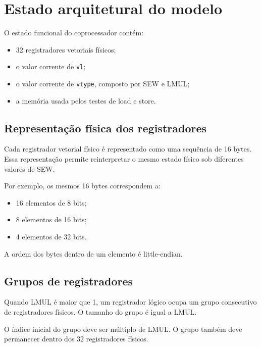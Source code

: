 \section{Estado arquitetural do modelo}

O estado funcional do coprocessador contém:

\begin{itemize}
    \item 32 registradores vetoriais físicos;
    \item o valor corrente de \texttt{vl};
    \item o valor corrente de \texttt{vtype}, composto por SEW e LMUL;
    \item a memória usada pelos testes de load e store.
\end{itemize}

\subsection{Representação física dos registradores}

Cada registrador vetorial físico é representado como uma sequência de
16 bytes. Essa representação permite reinterpretar o mesmo estado físico
sob diferentes valores de SEW.

Por exemplo, os mesmos 16 bytes correspondem a:

\begin{itemize}
    \item 16 elementos de 8 bits;
    \item 8 elementos de 16 bits;
    \item 4 elementos de 32 bits.
\end{itemize}

A ordem dos bytes dentro de um elemento é little-endian.

\subsection{Grupos de registradores}

Quando LMUL é maior que 1, um registrador lógico ocupa um grupo
consecutivo de registradores físicos. O tamanho do grupo é igual a LMUL.

O índice inicial do grupo deve ser múltiplo de LMUL. O grupo também deve
permanecer dentro dos 32 registradores físicos.

